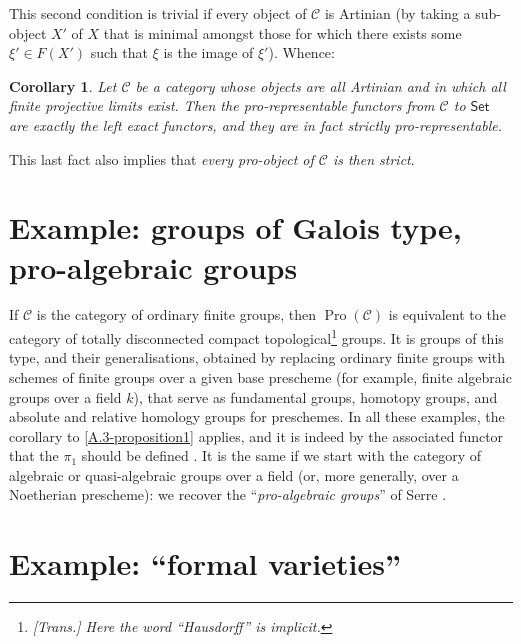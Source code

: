 \documentclass{article}
\theoremstyle{plain}
\newtheorem*{corollary*}{Corollary}
\theoremstyle{definition}
\newcommand{\cat}[1]{{\mathcal{#1}}}
\newcommand{\Set}{\mathsf{Set}}
\DeclareMathOperator{\Pro}{Pro}
\begin{document}
This second condition is trivial if every object of $\cat{C}$ is Artinian (by taking a sub-object $X'$ of $X$ that is minimal amongst those for which there exists some $\xi'\in F(X')$ such that $\xi$ is the image of $\xi'$).
Whence:

\begin{corollary*}
  Let $\cat{C}$ be a category whose objects are all Artinian and in which all finite projective limits exist.
  Then the pro-representable functors from $\cat{C}$ to $\Set$ are exactly the left exact functors, and they are in fact strictly pro-representable.
\end{corollary*}

This last fact also implies that \emph{every pro-object of $\cat{C}$ is then strict}.


\section{Example: groups of Galois type, pro-algebraic groups}
\label{A.4}

If $\cat{C}$ is the category of ordinary finite groups, then $\Pro(\cat{C})$ is equivalent to the category of totally disconnected compact topological\footnote{\emph{[Trans.] Here the word ``Hausdorff'' is implicit.}} groups.
It is groups of this type, and their generalisations, obtained by replacing ordinary finite groups with schemes of finite groups over a given base prescheme (for example, finite algebraic groups over a field $k$), that serve as fundamental groups, homotopy groups, and absolute and relative homology groups for preschemes.
In all these examples, the corollary to \cref{A.3-proposition1} applies, and it is indeed by the associated functor that the $\pi_1$ should be defined \cite{2}.
It is the same if we start with the category of algebraic or quasi-algebraic groups over a field (or, more generally, over a Noetherian prescheme): we recover the ``\emph{pro-algebraic groups}'' of Serre \cite{4}.


\section{Example: ``formal varieties''}
\label{A.5}
\end{document}
